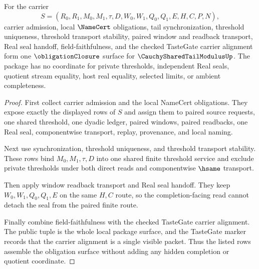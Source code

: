 \begin{theorem}
\label{thm:cauchy-shared-tail-modulus-obligation-closure-package}
For the carrier
$$
S=(R_0,R_1,M_0,M_1,\tau,D,W_0,W_1,Q_0,Q_1,E,H,C,P,N),
$$
carrier admission, local $\NameCert$ obligations, tail synchronization, threshold uniqueness, threshold transport stability, paired window and readback transport, Real seal handoff, field-faithfulness, and the checked TasteGate carrier alignment form one $\obligationClosure$ surface for $\CauchySharedTailModulusUp$. The package has no coordinate for private thresholds, independent Real seals, quotient stream equality, host real equality, selected limits, or ambient completeness.
\end{theorem}
\begin{proof}
First collect carrier admission and the local NameCert obligations. They expose exactly the displayed rows of $S$ and assign them to paired source requests, one shared threshold, one dyadic ledger, paired windows, paired readbacks, one Real seal, componentwise transport, replay, provenance, and local naming.

Next use synchronization, threshold uniqueness, and threshold transport stability. These rows bind $M_0,M_1,\tau,D$ into one shared finite threshold service and exclude private thresholds under both direct reads and componentwise $\hsame$ transport.

Then apply window readback transport and Real seal handoff. They keep $W_0,W_1,Q_0,Q_1,E$ on the same $H,C$ route, so the completion-facing read cannot detach the seal from the paired finite route.

Finally combine field-faithfulness with the checked TasteGate carrier alignment. The public tuple is the whole local package surface, and the TasteGate marker records that the carrier alignment is a single visible packet. Thus the listed rows assemble the obligation surface without adding any hidden completion or quotient coordinate.
\end{proof}

